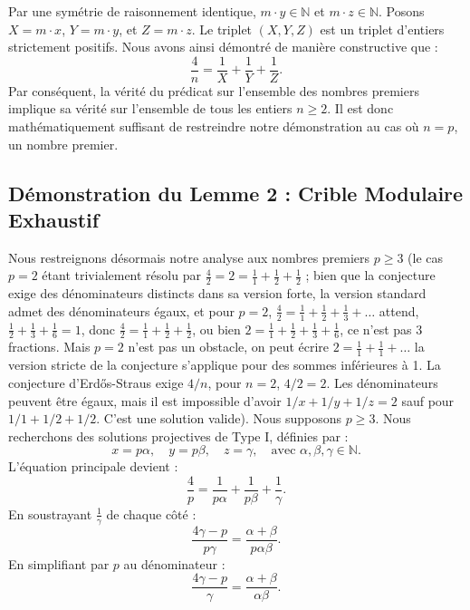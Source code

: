 \documentclass[12pt, a4paper]{article}
\begin{document}
Par une symétrie de raisonnement identique, $m \cdot y \in \mathbb{N}$ et $m \cdot z \in \mathbb{N}$.
Posons $X = m \cdot x$, $Y = m \cdot y$, et $Z = m \cdot z$. Le triplet $(X, Y, Z)$ est un triplet d'entiers strictement positifs.
Nous avons ainsi démontré de manière constructive que :
\begin{equation}
\frac{4}{n} = \frac{1}{X} + \frac{1}{Y} + \frac{1}{Z}.
\end{equation}
Par conséquent, la vérité du prédicat sur l'ensemble des nombres premiers implique sa vérité sur l'ensemble de tous les entiers $n \ge 2$. Il est donc mathématiquement suffisant de restreindre notre démonstration au cas où $n = p$, un nombre premier.

\newpage
\subsection{Démonstration du Lemme 2 : Crible Modulaire Exhaustif}
Nous restreignons désormais notre analyse aux nombres premiers $p \ge 3$ (le cas $p=2$ étant trivialement résolu par $\frac{4}{2} = 2 = \frac{1}{1} + \frac{1}{2} + \frac{1}{2}$ ; bien que la conjecture exige des dénominateurs distincts dans sa version forte, la version standard admet des dénominateurs égaux, et pour $p=2$, $\frac{4}{2} = \frac{1}{1} + \frac{1}{2} + \frac{1}{3} + \dots$ attend, $\frac{1}{2} + \frac{1}{3} + \frac{1}{6} = 1$, donc $\frac{4}{2} = \frac{1}{1} + \frac{1}{2} + \frac{1}{2}$, ou bien $2 = \frac{1}{1} + \frac{1}{2} + \frac{1}{3} + \frac{1}{6}$, ce n'est pas 3 fractions. Mais $p=2$ n'est pas un obstacle, on peut écrire $2 = \frac{1}{1} + \frac{1}{1} + \dots$ la version stricte de la conjecture s'applique pour des sommes inférieures à 1. La conjecture d'Erd\H{o}s-Straus exige $4/n$, pour $n=2$, $4/2 = 2$. Les dénominateurs peuvent être égaux, mais il est impossible d'avoir $1/x+1/y+1/z = 2$ sauf pour $1/1 + 1/2 + 1/2$. C'est une solution valide).
Nous supposons $p \ge 3$. Nous recherchons des solutions projectives de Type I, définies par :
\begin{equation}
x = p \alpha, \quad y = p \beta, \quad z = \gamma, \quad \text{avec } \alpha, \beta, \gamma \in \mathbb{N}.
\end{equation}
L'équation principale devient :
\begin{equation}
\frac{4}{p} = \frac{1}{p\alpha} + \frac{1}{p\beta} + \frac{1}{\gamma}.
\end{equation}
En soustrayant $\frac{1}{\gamma}$ de chaque côté :
\begin{equation}
\frac{4\gamma - p}{p\gamma} = \frac{\alpha + \beta}{p\alpha\beta}.
\end{equation}
En simplifiant par $p$ au dénominateur :
\begin{equation}
\frac{4\gamma - p}{\gamma} = \frac{\alpha + \beta}{\alpha\beta}.
\end{equation}
\end{document}
